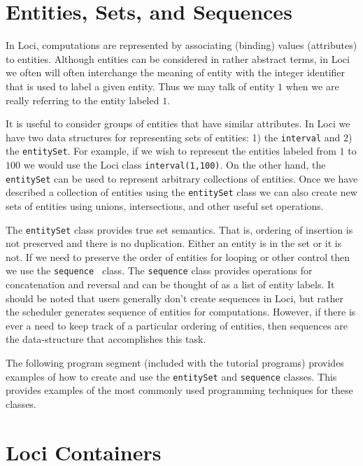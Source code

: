 \documentclass[10pt,epsf]{book}
\begin{document}
\section{Entities, Sets, and Sequences}

In Loci, computations are represented by associating (binding) values
(attributes) to entities.  Although entities can be considered in
rather abstract terms, in Loci we often will often interchange the
meaning of entity with the integer identifier that is used to label a
given entity.  Thus we may talk of entity $1$ when we are really
referring to the entity labeled $1$.  

It is useful to consider groups of entities that have similar
attributes.  In Loci we have two data structures for representing sets
of entities:  1) the {\tt interval} and 2) the {\tt entitySet}.  For
example, if we wish to represent the entities labeled from $1$ to
$100$ we would use the Loci class {\tt interval(1,100)}.  On the other
hand, the {\tt entitySet} can be used to represent arbitrary
collections of entities.  Once we have described a collection of
entities using the {\tt entitySet} class we can also create new sets
of entities using unions, intersections, and other useful set
operations.  

The {\tt entitySet} class provides true set semantics.
That is, ordering of insertion is not preserved and there is no
duplication.  Either an entity is in the set or it is not.  If we need
to preserve the order of entities for looping or other control then we
use the {\tt sequence } class.  The {\tt sequence} class provides
operations for concatenation and reversal and can be thought
of as a list of entity labels.  It should be noted that users
generally don't create sequences in Loci, but rather the scheduler
generates sequence of entities for computations.  However, if there is
ever a need to keep track of a particular ordering of entities, then
sequences are the data-structure that accomplishes this task.

The following program segment (included with the tutorial programs)
provides examples of how to create and use the {\tt  entitySet} and
{\tt sequence} classes.  This provides examples of the most commonly
used programming techniques for these classes.



\section{Loci Containers}
\end{document}

